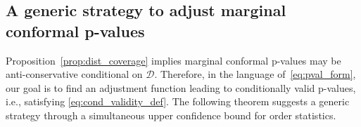 


\subsection{A generic strategy to adjust marginal conformal p-values}

Proposition~\ref{prop:dist_coverage} implies marginal conformal p-values may be anti-conservative conditional on $\mathcal{D}$. Therefore, in the language of~\eqref{eq:pval_form}, our goal is to find an adjustment function leading to conditionally valid p-values, i.e.,  satisfying \eqref{eq:cond_validity_def}. The following theorem suggests a generic strategy through a simultaneous upper confidence bound for order statistics.

